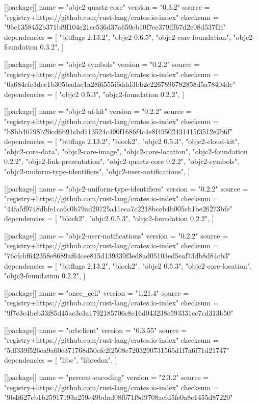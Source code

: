 [[package]]
name = "objc2-quartz-core"
version = "0.3.2"
source = "registry+https://github.com/rust-lang/crates.io-index"
checksum = "96c1358452b371bf9f104e21ec536d37a650eb10f7ee379fff67d2e08d537f1f"
dependencies = [
 "bitflags 2.13.2",
 "objc2 0.6.5",
 "objc2-core-foundation",
 "objc2-foundation 0.3.2",
]

[[package]]
name = "objc2-symbols"
version = "0.2.2"
source = "registry+https://github.com/rust-lang/crates.io-index"
checksum = "0a684efe3dec1b305badae1a28f6555f6ddd3bb2c2267896782858d5a78404dc"
dependencies = [
 "objc2 0.5.3",
 "objc2-foundation 0.2.2",
]

[[package]]
name = "objc2-ui-kit"
version = "0.2.2"
source = "registry+https://github.com/rust-lang/crates.io-index"
checksum = "b8bb46798b20cd6b91cbd113524c490f1686f4c4e8f49502431415f3512e2b6f"
dependencies = [
 "bitflags 2.13.2",
 "block2",
 "objc2 0.5.3",
 "objc2-cloud-kit",
 "objc2-core-data",
 "objc2-core-image",
 "objc2-core-location",
 "objc2-foundation 0.2.2",
 "objc2-link-presentation",
 "objc2-quartz-core 0.2.2",
 "objc2-symbols",
 "objc2-uniform-type-identifiers",
 "objc2-user-notifications",
]

[[package]]
name = "objc2-uniform-type-identifiers"
version = "0.2.2"
source = "registry+https://github.com/rust-lang/crates.io-index"
checksum = "44fa5f9748dbfe1ca6c0b79ad20725a11eca7c2218bceb4b005cb1be26273bfe"
dependencies = [
 "block2",
 "objc2 0.5.3",
 "objc2-foundation 0.2.2",
]

[[package]]
name = "objc2-user-notifications"
version = "0.2.2"
source = "registry+https://github.com/rust-lang/crates.io-index"
checksum = "76cfcbf642358e8689af64cee815d139339f3ed8ad05103ed5eaf73db8d84cb3"
dependencies = [
 "bitflags 2.13.2",
 "block2",
 "objc2 0.5.3",
 "objc2-core-location",
 "objc2-foundation 0.2.2",
]

[[package]]
name = "once_cell"
version = "1.21.4"
source = "registry+https://github.com/rust-lang/crates.io-index"
checksum = "9f7c3e4beb33f85d45ae3e3a1792185706c8e16d043238c593331cc7cd313b50"

[[package]]
name = "orbclient"
version = "0.3.55"
source = "registry+https://github.com/rust-lang/crates.io-index"
checksum = "5df339f526ea9a60e371768d50efc2f2508c7203290731565d1f7a6f71d21747"
dependencies = [
 "libc",
 "libredox",
]

[[package]]
name = "percent-encoding"
version = "2.3.2"
source = "registry+https://github.com/rust-lang/crates.io-index"
checksum = "9b4f627cb1b25917193a259e49bdad08f671f8d9708acfd5fe0a8c1455d87220"

